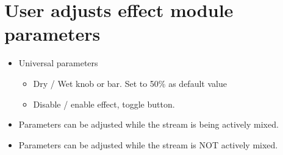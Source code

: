 \section{User adjusts effect module parameters}

\begin{itemize}
	\item Universal parameters
	\begin{itemize}
		\item Dry / Wet knob or bar. Set to 50\% as default value
		\item Disable / enable effect, toggle button.
	\end{itemize}

	\item Parameters can be adjusted while the stream is being actively mixed.
	\item Parameters can be adjusted while the stream is NOT actively mixed.


\end{itemize}